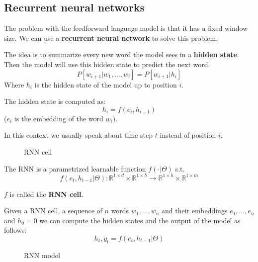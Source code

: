 \subsection{Recurrent neural networks}
\label{sec:recurrent_neural_networks}

The problem with the feedforward language model is that it has a fixed window size.
We can use a \textbf{recurrent neural network} to solve this problem.

The idea is to summarize every new word the model sees in a \textbf{hidden state}.
Then the model will use this hidden state to predict the next word.
\[
    P[w_{i+1}|w_1,\dots,w_i]=P[w_{i+1}|h_i]
\]
Where $h_i$ is the hidden state of the model up to position $i$.

The hidden state is computed as:
\[
    h_i=f(e_i,h_{i-1})
\]
($e_i$ is the embedding of the word $w_i$).

In this context we usually speak about time step $t$ instead of position $i$.

\begin{figure}[H]
    \centering
    \caption{RNN cell}
    \label{fig:rnn_cell}
\end{figure}

The RNN is a parametrized learnable function $f(\cdot|\Theta)$ s.t.
\[
    f(e_t,h_{t-1}|\Theta): \mathbb{R}^{1\times d}\times\mathbb{R}^{1\times h}\rightarrow\mathbb{R}^{1\times h}\times\mathbb{R}^{1\times m}
\]

$f$ is called the \textbf{RNN cell}.

Given a RNN cell, a sequence of $n$ words $w_1,\dots,w_n$ and their embeddings $e_1,\dots,e_n$ and $h_0=0$
we can compute the hidden states and the output of the model as follows:
\[
    h_t,y_t=f(e_t,h_{t-1}|\Theta)
\]

\begin{figure}[H]
    \centering
    \caption{RNN model}
    \label{fig:rnn_model}
\end{figure}

